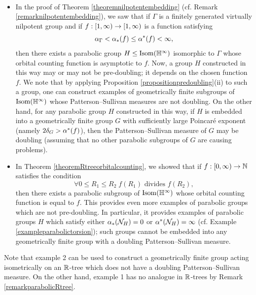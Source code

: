 \begin{examples}
\label{exampledoublingnondoubling}
~
\begin{itemize}
\item[1.] In the proof of Theorem \ref{theoremnilpotentembedding} (cf. Remark \ref{remarknilpotentembedding}), we saw that if $\Gamma$ is a finitely generated virtually nilpotent group and if $f:[1,\infty)\to[1,\infty)$ is a function satisfying
\[
\alpha_\Gamma < \alpha_*(f) \leq \alpha^*(f) < \infty,
\]
then there exists a parabolic group $H\leq\Isom(\H^\infty)$ isomorphic to $\Gamma$ whose orbital counting function is asymptotic to $f$. Now, a group $H$ constructed in this way may or may not be pre-doubling; it depends on the chosen function $f$. We note that by applying Proposition \ref{propositionpredoubling}(ii) to such a group, one can construct examples of geometrically finite subgroups of $\Isom(\H^\infty)$ whose Patterson--Sullivan measures are not doubling. On the other hand, for any parabolic group $H$ constructed in this way, if $H$ is embedded into a geometrically finite group $G$ with sufficiently large Poincar\'e exponent (namely $2\delta_G > \alpha^*(f)$), then the Patterson--Sullivan measure of $G$ may be doubling (assuming that no other parabolic subgroups of $G$ are causing problems).
\item[2.] In Theorem \ref{theoremRtreeorbitalcounting}, we showed that if $f:\Rplus\to\N$ satisfies the condition
\[
\forall 0\leq R_1 \leq R_2 \; \text{$f(R_1)$ divides $f(R_2)$},
\]
then there exists a parabolic subgroup of $\Isom(\H^\infty)$ whose orbital counting function is equal to $f$. This provides even more examples of parabolic groups which are not pre-doubling. In particular, it provides examples of parabolic groups $H$ which satisfy either $\alpha_*(\mathcal N_H) = 0$ or $\alpha^*(\mathcal N_H) = \infty$ (cf. Example \ref{exampleparabolictorsion}); such groups cannot be embedded into any geometrically finite group with a doubling Patterson--Sullivan measure.
\end{itemize}
\end{examples}

Note that example 2 can be used to construct a geometrically finite group acting isometrically on an $\R$-tree which does not have a doubling Patterson--Sullivan measure. On the other hand, example 1 has no analogue in $\R$-trees by Remark \ref{remarkparabolicRtree}.


